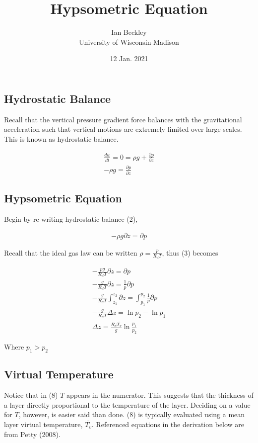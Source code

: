 \documentclass[a4paper,12pt]{article}
\begin{document}
\title{\vspace{-4.0cm}Hypsometric Equation}
\author{Ian Beckley
\\University of Wisconsin-Madison}

\date{12 Jan. 2021}

\maketitle

\subsection*{Hydrostatic Balance}
Recall that the vertical pressure gradient force balances with the gravitational acceleration such that vertical motions are extremely limited over large-scales. This is known as hydrostatic balance.

\begin{align}
\frac{dw}{dt} = 0 = \rho g + \frac{\partial p}{\partial z}\\
\boxed{-\rho g = \frac{\partial p}{\partial z}}
\end{align}

\subsection*{Hypsometric Equation}
Begin by re-writing hydrostatic balance (2),

\begin{align}
-\rho g \partial z = \partial p
\end{align}

Recall that the ideal gas law can be written $\rho = \frac{p}{R_d T}$, thus (3) becomes

\begin{align}
-\frac{pg}{R_d T} \partial z = \partial p\\
-\frac{g}{R_d T} \partial z = \frac{1}{p} \partial p\\
-\frac{g}{R_d T} \int_{z_1}^{z_2} \partial z = \int_{p_1}^{p_2} \frac{1}{p} \partial p\\
-\frac{g}{R_d T} \Delta z = \ln{p_2} - \ln{p_1}\\
\boxed{\Delta z =\frac{R_d \overline{T_v}}{g} \ln{\frac{p_1}{p_2}}}
\end{align}

Where $p_1 > p_2$

\subsection*{Virtual Temperature}
Notice that in (8) $T$ appears in the numerator. This suggests that the thickness of a layer directly proportional to the temperature of the layer. Deciding on a value for $T$, however, is easier said than done. (8) is typically evaluated using a mean layer virtual temperature, $\overline{T_v}$. Referenced equations in the derivation below are from Petty (2008).
\end{document}
